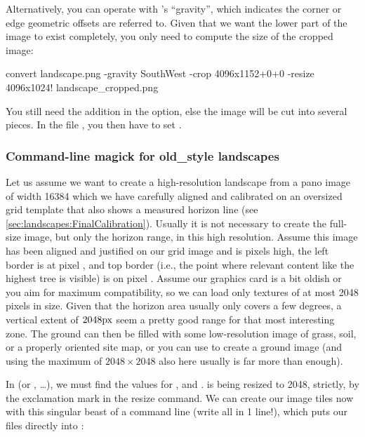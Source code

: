 Alternatively, you can operate with 's ``gravity'', which indicates
the corner or edge geometric offsets are referred to. Given that we
want the lower part of the image to exist completely, you only need to
compute the size of the cropped image:

\begin{commands}
convert landscape.png -gravity SouthWest -crop 4096x1152+0+0
        -resize 4096x1024! landscape_cropped.png
\end{commands}

\noindent You still need the addition  in the  option,
else the image will be cut into several pieces.  In the file
, you then have to set .


\subsubsection{Command-line magick for old\_style landscapes}
\label{sec:landscapes:ImageMagic:oldstyle}


Let us assume we want to create a high-resolution landscape from a
pano image of width 16384 which we have carefully aligned and
calibrated on an oversized grid template that also shows a measured
horizon line (see \ref{sec:landscapes:FinalCalibration}). Usually it
is not necessary to create the full-size image, but only the horizon
range, in this high resolution. Assume this image has been aligned and
justified on our grid image and is  pixels high, the left
border is at pixel , and top border (i.e., the point
where relevant content like the highest tree is visible) is on pixel
. Assume our graphics card is a bit oldish or you aim for
maximum compatibility, so we can load only textures of at most 2048
pixels in size. Given that the horizon area usually only covers a few
degrees, a vertical extent of $2048\mathrm{px}$ seem a pretty good range for
that most interesting zone. The ground can then be filled with some
low-resolution image of grass, soil, or a properly oriented site map,
or you can use  to create a ground image (and using the
maximum of $2048\times2048$ also here usually is far more than
enough).

In  (or , \ldots), we must find the values for
,  and .  is being
resized to 2048, strictly, by the exclamation mark in the resize
command.  We can create our image tiles now with this singular beast
of a command line (write all in 1 line!), which puts our files directly into
:

